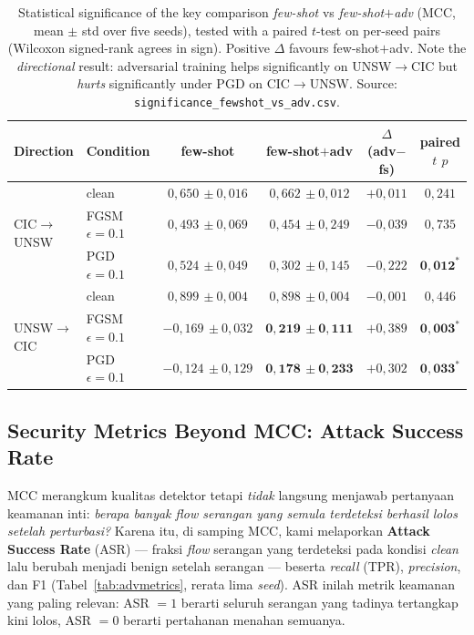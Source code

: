 \documentclass[11pt,a4paper]{article}
\begin{document}
\begin{table}[h]
\centering
\caption{Statistical significance of the key comparison \emph{few-shot} vs
\emph{few-shot$+$adv} (MCC, mean $\pm$ std over five seeds), tested with a paired
$t$-test on per-seed pairs (Wilcoxon signed-rank agrees in sign). Positive $\Delta$
favours few-shot$+$adv. Note the \emph{directional} result: adversarial training
helps significantly on UNSW$\rightarrow$CIC but \emph{hurts} significantly under PGD
on CIC$\rightarrow$UNSW. Source: \texttt{significance\_fewshot\_vs\_adv.csv}.}
\label{tab:significance}
\small
\begin{tabular}{llcccc}
\toprule
Direction & Condition & few-shot & few-shot$+$adv & $\Delta$ (adv$-$fs) & paired $t$ $p$ \\
\midrule
\multirow{3}{*}{CIC$\rightarrow$UNSW}
 & clean            & $0{,}650\,{\pm}0{,}016$ & $0{,}662\,{\pm}0{,}012$ & $+0{,}011$ & $0{,}241$ \\
 & FGSM $\epsilon{=}0.1$ & $0{,}493\,{\pm}0{,}069$ & $0{,}454\,{\pm}0{,}249$ & $-0{,}039$ & $0{,}735$ \\
 & PGD $\epsilon{=}0.1$  & $0{,}524\,{\pm}0{,}049$ & $0{,}302\,{\pm}0{,}145$ & $-0{,}222$ & $\mathbf{0{,}012}^{\ast}$ \\
\midrule
\multirow{3}{*}{UNSW$\rightarrow$CIC}
 & clean            & $0{,}899\,{\pm}0{,}004$ & $0{,}898\,{\pm}0{,}004$ & $-0{,}001$ & $0{,}446$ \\
 & FGSM $\epsilon{=}0.1$ & $-0{,}169\,{\pm}0{,}032$ & $\mathbf{0{,}219\,{\pm}0{,}111}$ & $+0{,}389$ & $\mathbf{0{,}003}^{\ast}$ \\
 & PGD $\epsilon{=}0.1$  & $-0{,}124\,{\pm}0{,}129$ & $\mathbf{0{,}178\,{\pm}0{,}233}$ & $+0{,}302$ & $\mathbf{0{,}033}^{\ast}$ \\
\bottomrule
\end{tabular}

\vspace{0.3em}
\end{table}

\subsection{Security Metrics Beyond MCC: Attack Success Rate}
\label{sec:advmetrics}
MCC merangkum kualitas detektor tetapi \emph{tidak} langsung menjawab pertanyaan
keamanan inti: \emph{berapa banyak \emph{flow} serangan yang semula terdeteksi
berhasil lolos setelah perturbasi?} Karena itu, di samping MCC, kami melaporkan
\textbf{Attack Success Rate} (ASR) --- fraksi \emph{flow} serangan yang terdeteksi
pada kondisi \emph{clean} lalu berubah menjadi benign setelah serangan --- beserta
\emph{recall} (TPR), \emph{precision}, dan F1 (Tabel~\ref{tab:advmetrics}, rerata
lima \emph{seed}). ASR inilah metrik keamanan yang paling relevan: ASR $=1$ berarti
seluruh serangan yang tadinya tertangkap kini lolos, ASR $=0$ berarti pertahanan
menahan semuanya.
\end{document}
